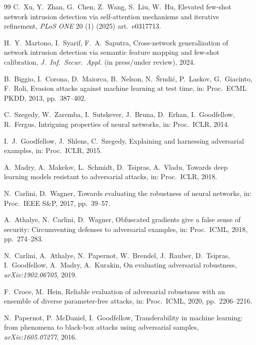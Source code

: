 \documentclass[preprint,12pt,authoryear]{elsarticle}
\begin{document}
\begin{thebibliography}{99}
C.~Xu, Y.~Zhan, G.~Chen, Z.~Wang, S.~Liu, W.~Hu, Elevated few-shot network
intrusion detection via self-attention mechanisms and iterative refinement,
\textit{PLoS ONE} 20 (1) (2025) art.~e0317713.

H.~Y.~Martono, I.~Syarif, F.~A.~Saputra, Cross-network generalization of network
intrusion detection via semantic feature mapping and few-shot calibration,
\textit{J.\ Inf.\ Secur.\ Appl.} (in press/under review), 2024.

B.~Biggio, I.~Corona, D.~Maiorca, B.~Nelson, N.~\v{S}rndi\'c, P.~Laskov,
G.~Giacinto, F.~Roli, Evasion attacks against machine learning at test time, in:
Proc.\ ECML PKDD, 2013, pp.~387--402.

C.~Szegedy, W.~Zaremba, I.~Sutskever, J.~Bruna, D.~Erhan, I.~Goodfellow, R.~Fergus,
Intriguing properties of neural networks, in: Proc.\ ICLR, 2014.

I.~J.~Goodfellow, J.~Shlens, C.~Szegedy, Explaining and harnessing adversarial
examples, in: Proc.\ ICLR, 2015.

A.~Madry, A.~Makelov, L.~Schmidt, D.~Tsipras, A.~Vladu, Towards deep learning
models resistant to adversarial attacks, in: Proc.\ ICLR, 2018.

N.~Carlini, D.~Wagner, Towards evaluating the robustness of neural networks, in:
Proc.\ IEEE S\&P, 2017, pp.~39--57.

A.~Athalye, N.~Carlini, D.~Wagner, Obfuscated gradients give a false sense of
security: Circumventing defenses to adversarial examples, in: Proc.\ ICML, 2018,
pp.~274--283.

N.~Carlini, A.~Athalye, N.~Papernot, W.~Brendel, J.~Rauber, D.~Tsipras,
I.~Goodfellow, A.~Madry, A.~Kurakin, On evaluating adversarial robustness,
\textit{arXiv:1902.06705}, 2019.

F.~Croce, M.~Hein, Reliable evaluation of adversarial robustness with an ensemble
of diverse parameter-free attacks, in: Proc.\ ICML, 2020, pp.~2206--2216.

N.~Papernot, P.~McDaniel, I.~Goodfellow, Transferability in machine learning: from
phenomena to black-box attacks using adversarial samples, \textit{arXiv:1605.07277},
2016.


\end{thebibliography}
\end{document}
